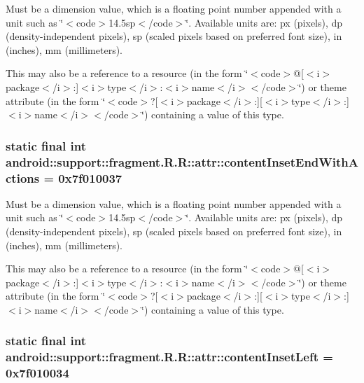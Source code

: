 Must be a dimension value, which is a floating point number appended with a unit such as \char`\"{}$<$code$>$14.5sp$<$/code$>$\char`\"{}. Available units are: px (pixels), dp (density-independent pixels), sp (scaled pixels based on preferred font size), in (inches), mm (millimeters). 

This may also be a reference to a resource (in the form \char`\"{}$<$code$>$@\mbox{[}$<$i$>$package$<$/i$>$:\mbox{]}$<$i$>$type$<$/i$>$:$<$i$>$name$<$/i$>$$<$/code$>$\char`\"{}) or theme attribute (in the form \char`\"{}$<$code$>$?\mbox{[}$<$i$>$package$<$/i$>$:\mbox{]}\mbox{[}$<$i$>$type$<$/i$>$:\mbox{]}$<$i$>$name$<$/i$>$$<$/code$>$\char`\"{}) containing a value of this type. \hypertarget{classandroid_1_1support_1_1fragment_1_1_r_1_1attr_c9070dfaa2466bf60e30e5a7ffe7047e}{
\subsubsection[{contentInsetEndWithActions}]{\setlength{\rightskip}{0pt plus 5cm}static final int android::support::fragment.R.R::attr::contentInsetEndWithActions = 0x7f010037}}
\label{classandroid_1_1support_1_1fragment_1_1_r_1_1attr_c9070dfaa2466bf60e30e5a7ffe7047e}


Must be a dimension value, which is a floating point number appended with a unit such as \char`\"{}$<$code$>$14.5sp$<$/code$>$\char`\"{}. Available units are: px (pixels), dp (density-independent pixels), sp (scaled pixels based on preferred font size), in (inches), mm (millimeters). 

This may also be a reference to a resource (in the form \char`\"{}$<$code$>$@\mbox{[}$<$i$>$package$<$/i$>$:\mbox{]}$<$i$>$type$<$/i$>$:$<$i$>$name$<$/i$>$$<$/code$>$\char`\"{}) or theme attribute (in the form \char`\"{}$<$code$>$?\mbox{[}$<$i$>$package$<$/i$>$:\mbox{]}\mbox{[}$<$i$>$type$<$/i$>$:\mbox{]}$<$i$>$name$<$/i$>$$<$/code$>$\char`\"{}) containing a value of this type. \hypertarget{classandroid_1_1support_1_1fragment_1_1_r_1_1attr_5331d3f97a1bf6a4c1ce722d96b9cc2b}{
\subsubsection[{contentInsetLeft}]{\setlength{\rightskip}{0pt plus 5cm}static final int android::support::fragment.R.R::attr::contentInsetLeft = 0x7f010034}}
\label{classandroid_1_1support_1_1fragment_1_1_r_1_1attr_5331d3f97a1bf6a4c1ce722d96b9cc2b}


